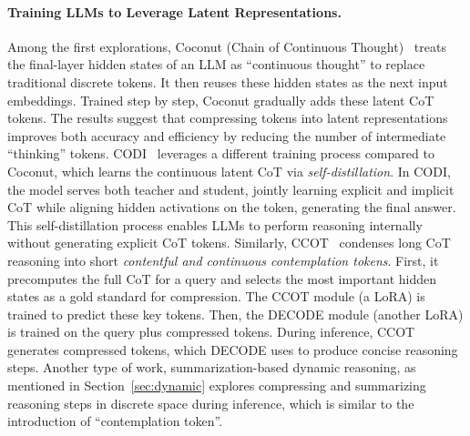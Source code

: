 \paragraph{Training LLMs to Leverage Latent Representations.}
%
Among the first explorations, Coconut (Chain of Continuous Thought)~\cite{hao2024training} treats the final-layer hidden states of an LLM as ``continuous thought'' to replace traditional discrete tokens. It then reuses these hidden states as the next input embeddings. Trained step by step, Coconut gradually adds these latent CoT tokens. The results suggest that compressing tokens into latent representations improves both accuracy and efficiency by reducing the number of intermediate ``thinking'' tokens.
%
CODI~\cite{shen2025codi} leverages a different training process compared to Coconut, which learns the continuous latent CoT via \textit{self-distillation}. In CODI, the model serves both teacher and student, jointly learning explicit and implicit CoT while aligning hidden activations on the token, generating the final answer. This self-distillation process enables LLMs to perform reasoning internally without generating explicit CoT tokens.
%
Similarly, CCOT~\cite{cheng2024compressed} condenses long CoT reasoning into short \textit{contentful and continuous contemplation tokens}. First, it precomputes the full CoT for a query and selects the most important hidden states as a gold standard for compression. The CCOT module (a LoRA) is trained to predict these key tokens. Then, the DECODE module (another LoRA) is trained on the query plus compressed tokens. During inference, CCOT generates compressed tokens, which DECODE uses to produce concise reasoning steps. Another type of work, summarization-based dynamic reasoning, as mentioned in Section~\ref{sec:dynamic} explores compressing and summarizing reasoning steps in discrete space during inference, which is similar to the introduction of ``contemplation token''.

